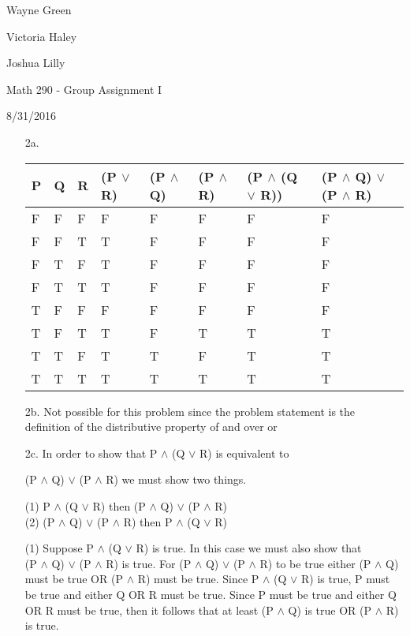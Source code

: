 \documentclass[11pt]{article}
\begin{document}
Wayne Green

Victoria Haley

Joshua Lilly

Math 290 - Group Assignment I

8/31/2016
\begin{flushleft}

\begin{enumerate}[widest={5.2}]
\item[2a.] \begin{center}
\begin{tabular}{| l | l | l | l | l | l | l | l |}
  \hline
  P & Q & R & (P $\vee$ R) & (P $\wedge$ Q) & (P $\wedge$ R) & (P $\wedge$ (Q $\vee$ R)) & (P $\wedge$ Q) $\vee$  (P $\wedge$ R) \\ \hline
  F & F & F & F & F & F & F & F\\ \hline
  F & F & T & T & F & F & F & F\\ \hline
  F & T & F & T & F & F & F & F\\ \hline
  F & T & T & T & F & F & F & F\\ \hline
  T & F & F & F & F & F & F & F\\ \hline
  T & F & T & T & F & T & T & T\\ \hline
  T & T & F & T & T & F & T & T\\ \hline
  T & T & T & T & T & T & T & T\\ \hline
  \end{tabular}
\end{center}

\item[2b.]
Not possible for this problem since the problem statement is the definition of the distributive property of and over or
  
\item[2c.]
In order to show that P $\wedge$ (Q $\vee$ R) is equivalent to 

(P $\wedge$ Q) $\vee$ (P $\wedge$ R) we must show two things.
 
\vspace{5mm} %
(1) P $\wedge$ (Q $\vee$ R) then 
(P $\wedge$ Q) $\vee$ (P $\wedge$ R)\\
(2) (P $\wedge$ Q) $\vee$ (P $\wedge$ R) then P $\wedge$ (Q $\vee$ R)
\bigskip

(1) Suppose P $\wedge$ (Q $\vee$ R) is true. In this case we must also show that\\ (P $\wedge$ Q) $\vee$ (P $\wedge$ R) is true. For (P $\wedge$ Q) $\vee$ (P $\wedge$ R) to be true either (P $\wedge$ Q) must be true OR (P $\wedge$ R) must be true. Since 
P $\wedge$ (Q $\vee$ R) is true, P must be true and either Q OR R must be true. Since P must be true and either Q OR R must be true, then it follows that at least 
(P $\wedge$ Q) is true OR (P $\wedge$ R) is true.  
\smallskip


\end{enumerate}
\end{flushleft}
\end{document}

